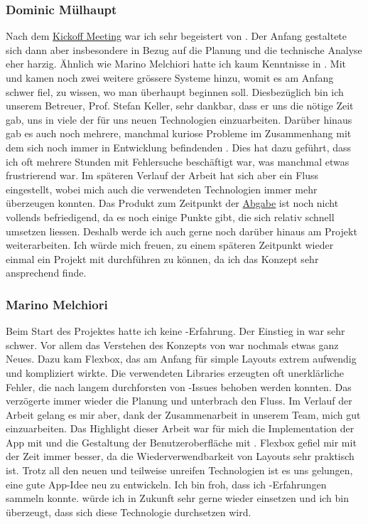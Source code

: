 \subsubsection{Dominic Mülhaupt}
Nach dem \hyperref[pm-ms1]{Kickoff Meeting} war ich sehr begeistert von \kort{}.
Der Anfang gestaltete sich dann aber insbesondere in Bezug auf die Planung und die technische Analyse eher harzig.
Ähnlich wie Marino Melchiori hatte ich kaum Kenntnisse in .
Mit  und  kamen noch zwei weitere grössere Systeme hinzu, womit es am Anfang schwer fiel, zu wissen, wo man überhaupt beginnen soll.
Diesbezüglich bin ich unserem Betreuer, Prof. Stefan Keller, sehr dankbar, dass er uns die nötige Zeit gab, uns in viele der für uns neuen Technologien einzuarbeiten.\newline
Darüber hinaus gab es auch noch mehrere, manchmal kuriose Probleme im Zusammenhang mit dem sich noch immer in Entwicklung befindenden .
Dies hat dazu geführt, dass ich oft mehrere Stunden mit Fehlersuche beschäftigt war, was manchmal etwas frustrierend war.
Im späteren Verlauf der Arbeit hat sich aber ein Fluss eingestellt, wobei mich auch die verwendeten Technologien immer mehr überzeugen konnten.
Das Produkt zum Zeitpunkt der \hyperref[pm-ms7]{Abgabe} ist noch nicht vollends befriedigend, da es noch einige Punkte gibt, die sich relativ schnell umsetzen liessen.
Deshalb werde ich auch gerne noch darüber hinaus am Projekt weiterarbeiten.\newline
Ich würde mich freuen, zu einem späteren Zeitpunkt wieder einmal ein Projekt mit  durchführen zu können, da ich das Konzept sehr ansprechend finde.

\subsubsection{Marino Melchiori}
Beim Start des Projektes hatte ich keine -Erfahrung. 
Der Einstieg in  war sehr schwer. 
Vor allem das Verstehen des Konzepts von  war nochmals etwas ganz Neues. 
Dazu kam Flexbox, das am Anfang für simple Layouts extrem aufwendig und kompliziert wirkte. \newline
Die verwendeten Libraries erzeugten oft unerklärliche Fehler, die nach langem durchforsten von -Issues behoben werden konnten. 
Das verzögerte immer wieder die Planung und unterbrach den Fluss. \newline
Im Verlauf der Arbeit gelang es mir aber, dank der Zusammenarbeit in unserem Team, mich gut  einzuarbeiten.
Das Highlight dieser Arbeit war für mich die Implementation der App mit  und die Gestaltung der Benutzeroberfläche mit . 
Flexbox gefiel mir mit der Zeit immer besser, da die Wiederverwendbarkeit von Layouts sehr praktisch ist. \newline
Trotz all den neuen und teilweise unreifen Technologien ist es uns gelungen, eine gute App-Idee neu zu entwickeln. 
Ich bin froh, dass ich -Erfahrungen sammeln konnte. 
 würde ich in Zukunft sehr gerne wieder einsetzen und ich bin überzeugt, dass sich diese Technologie durchsetzen wird. 
